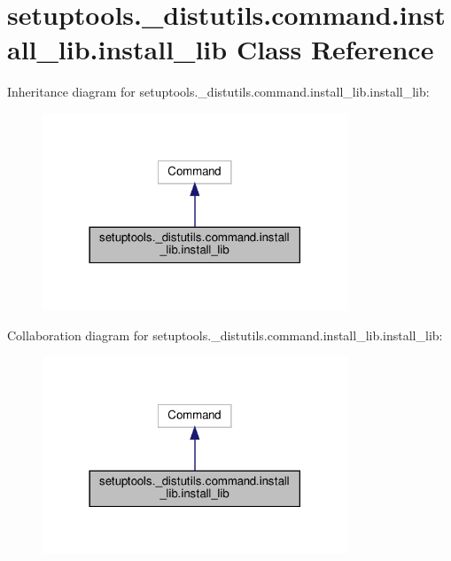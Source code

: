 \hypertarget{classsetuptools_1_1__distutils_1_1command_1_1install__lib_1_1install__lib}{}\section{setuptools.\+\_\+distutils.\+command.\+install\+\_\+lib.\+install\+\_\+lib Class Reference}
\label{classsetuptools_1_1__distutils_1_1command_1_1install__lib_1_1install__lib}


Inheritance diagram for setuptools.\+\_\+distutils.\+command.\+install\+\_\+lib.\+install\+\_\+lib\+:
\nopagebreak
\begin{figure}[H]
\begin{center}
\leavevmode
\includegraphics[width=258pt]{classsetuptools_1_1__distutils_1_1command_1_1install__lib_1_1install__lib__inherit__graph}
\end{center}
\end{figure}


Collaboration diagram for setuptools.\+\_\+distutils.\+command.\+install\+\_\+lib.\+install\+\_\+lib\+:
\nopagebreak
\begin{figure}[H]
\begin{center}
\leavevmode
\includegraphics[width=258pt]{classsetuptools_1_1__distutils_1_1command_1_1install__lib_1_1install__lib__coll__graph}
\end{center}
\end{figure}
